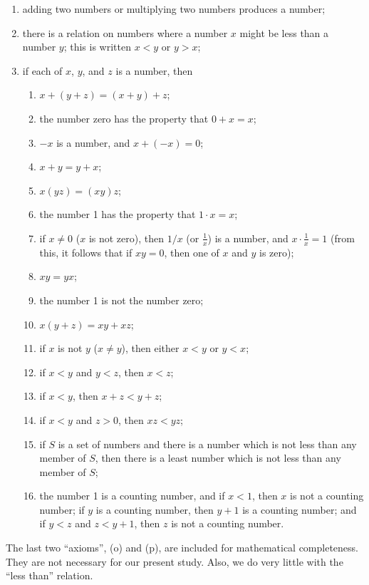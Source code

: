\documentclass{article}
\begin{document}
\begin{enumerate}[\hspace{1cm}(1)]
  \item adding two numbers or multiplying two numbers produces a number;
  \item there is a relation on numbers where a number $x$ might be less than a number $y$; this is written $x<y$ or $y>x$;
  \item if each of $x$, $y$, and $z$ is a number, then
    \begin{enumerate}[\hspace{1cm}(a)]
      \item $x+(y+z) = (x+y)+z$;
      \item the number zero has the property that $0+x = x$;
      \item $-x$ is a number, and $x + (-x) = 0$;
      \item $x+y = y+x$;
      \item $x(yz) = (xy)z$;
      \item the number 1 has the property that $1 \cdot x = x$;
      \item if $x \neq 0$ ($x$ is not zero), then $1/x$ (or $\frac{1}{x}$) is a number, and $x \cdot \frac{1}{x} = 1$ (from this, it follows that if $xy = 0$, then one of $x$ and $y$ is zero);
      \item $xy = yx$;
      \item the number 1 is not the number zero;
      \item $x(y+z) = xy+xz$;
      \item if $x$ is not $y$ ($x \neq y$), then either $x<y$ or $y<x$;
      \item if $x<y$ and $y<z$, then $x<z$;
      \item if $x<y$, then $x+z<y+z$;
      \item if $x<y$ and $z>0$, then $xz<yz$;
      \item if $S$ is a set of numbers and there is a number which is not less than any member of $S$, then there is a least number which is not less than any member of $S$;
      \item the number 1 is a counting number, and if $x<1$, then $x$ is not a counting number; if $y$ is a counting number, then $y+1$ is a counting number; and if $y<z$ and $z<y+1$, then $z$ is not a counting number.
    \end{enumerate}
\end{enumerate}

The last two ``axioms'', (o) and (p), are included for mathematical completeness. They are not necessary for our present study. Also, we do very little with the ``less than'' relation.
\end{document}

